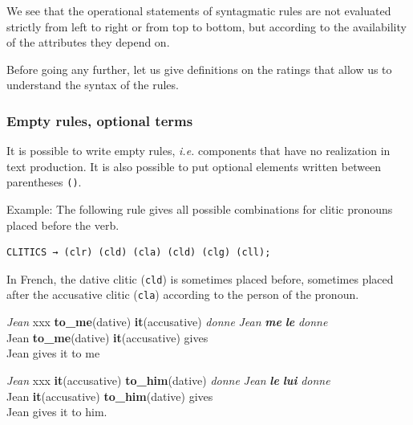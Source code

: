 \documentclass[11pt]{article}
\begin{document}
We see that the operational statements of syntagmatic rules are not
evaluated strictly from left to right or from top to bottom, but according
to the availability of the attributes they depend on.

Before going any further, let us give definitions on the ratings that
allow us to understand the syntax of the rules.

\subsubsection*{Empty rules, optional terms}

It is possible to write empty rules, \textit{i.e.}  components that have no
realization in text production. It is also possible to put optional
elements written between parentheses \verb#()#.

Example: The following rule gives all possible combinations for clitic
pronouns placed before the verb.

\begin{lstlisting}[numbers=none]
  CLITICS → (clr) (cld) (cla) (cld) (clg) (cll);
\end{lstlisting}

In French, the dative clitic (\texttt{cld}) is sometimes placed
before, sometimes placed after the accusative clitic (\texttt{cla})
according to the person of the pronoun.

\begin{exe}
	\ex \begin{xlist}
		\ex
		\begin{tabbing}
			\textit{Jean} xxx \= \textbf{to\_me}(dative) \= \textbf{it}(accusative) \= \textit{donne}\kill
			\textit{Jean} \>\textit{\textbf{me}} \>\textit{\textbf{le}} \>\textit{donne}\\
			Jean \> \textbf{to\_me}(dative) \> \textbf{it}(accusative) \> gives\\
			Jean gives it to me\\
		\end{tabbing}

		\ex
		\begin{tabbing}
			\textit{Jean} xxx \=\textbf{it}(accusative) \=\textbf{to\_him}(dative) \= \textit{donne}\kill
			\textit{Jean} \>\textit{\textbf{le}} \>\textit{\textbf{lui}} \>\textit{donne}\\
			Jean \>\textbf{it}(accusative) \>\textbf{to\_him}(dative) \>gives\\
			Jean gives it to him.
		\end{tabbing}
	\end{xlist}
\end{exe}
\end{document}
